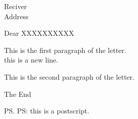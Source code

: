 \documentclass[12pt]{letter}
\begin{document}
\sffamily

\begin{letter}{Reciver \\ Address}

\opening{Dear XXXXXXXXXX}

This is the first paragraph of the letter. \\ this is a new line.

This is the second paragraph of the letter.

\closing{The End}
\ps PS: this is a postscript.


\end{letter}
\end{document}
